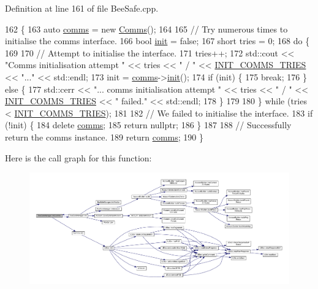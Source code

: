 Definition at line 161 of file Bee\+Safe.\+cpp.


\begin{DoxyCode}
162 \{
163     \textcolor{keyword}{auto} \hyperlink{class_bee_safe_manager_a80b19afbb679d08be14d67a45447f9e1}{comms} = \textcolor{keyword}{new} \hyperlink{class_comms}{Comms}();
164 
165     \textcolor{comment}{// Try numerous times to initialise the comms interface.}
166     \textcolor{keywordtype}{bool} \hyperlink{class_bee_safe_manager_a2f16b09c454e21c887d14ac5483973cf}{init} = \textcolor{keyword}{false};
167     \textcolor{keywordtype}{short} tries = 0;
168     \textcolor{keywordflow}{do} \{
169 
170         \textcolor{comment}{// Attempt to initialise the interface.}
171         tries++;
172         std::cout << \textcolor{stringliteral}{"Comms initialisation attempt "} << tries << \textcolor{stringliteral}{" / "} << 
      \hyperlink{_bee_safe_8cpp_aa5860d80bbb4527d5d2275aacfce65f7}{INIT\_COMMS\_TRIES} << \textcolor{stringliteral}{"..."} <<  std::endl;
173         init = \hyperlink{class_bee_safe_manager_a80b19afbb679d08be14d67a45447f9e1}{comms}->\hyperlink{class_comms_aa0519d3ed2d5bd6aad60101080ac2de7}{init}();
174         \textcolor{keywordflow}{if} (init) \{
175             \textcolor{keywordflow}{break};
176         \} \textcolor{keywordflow}{else} \{
177             std::cerr << \textcolor{stringliteral}{"... comms initialisation attempt "} << tries << \textcolor{stringliteral}{" / "} << 
      \hyperlink{_bee_safe_8cpp_aa5860d80bbb4527d5d2275aacfce65f7}{INIT\_COMMS\_TRIES} << \textcolor{stringliteral}{" failed."} << std::endl;
178         \}
179 
180     \} \textcolor{keywordflow}{while} (tries < \hyperlink{_bee_safe_8cpp_aa5860d80bbb4527d5d2275aacfce65f7}{INIT\_COMMS\_TRIES});
181 
182     \textcolor{comment}{// We failed to initialise the interface.}
183     \textcolor{keywordflow}{if} (!init) \{
184         \textcolor{keyword}{delete} \hyperlink{class_bee_safe_manager_a80b19afbb679d08be14d67a45447f9e1}{comms};
185         \textcolor{keywordflow}{return} \textcolor{keyword}{nullptr};
186     \}
187 
188     \textcolor{comment}{// Successfully return the comms instance.}
189     \textcolor{keywordflow}{return} \hyperlink{class_bee_safe_manager_a80b19afbb679d08be14d67a45447f9e1}{comms};
190 \}
\end{DoxyCode}
Here is the call graph for this function\+:\nopagebreak
\begin{figure}[H]
\begin{center}
\leavevmode
\includegraphics[width=350pt]{d5/d75/class_bee_safe_manager_a28306d7ccf7136a6086d666f4ebb6566_cgraph}
\end{center}
\end{figure}
